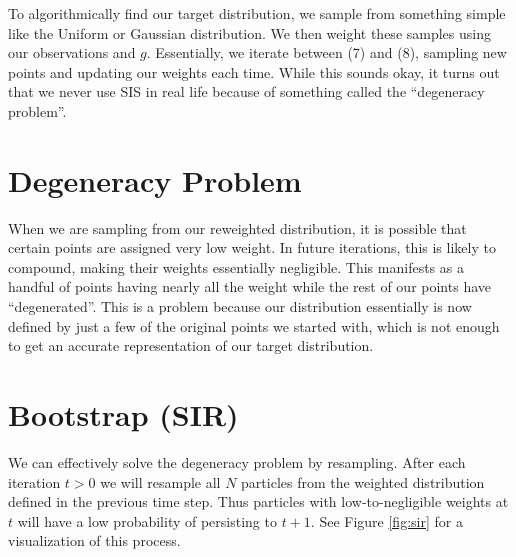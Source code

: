 \documentclass{article}
\begin{document}
To algorithmically find our target distribution, we sample from something simple like the Uniform or Gaussian distribution. We then weight these samples using our observations and $g$. Essentially, we iterate between (7) and (8), sampling new points and updating our weights each time. While this sounds okay, it turns out that we never use SIS in real life because of something called the ``degeneracy problem''.

\section{Degeneracy Problem}
When we are sampling from our reweighted distribution, it is possible that certain points are assigned very low weight. In future iterations, this is likely to compound, making their weights essentially negligible. This manifests as a handful of points having nearly all the weight while the rest of our points have ``degenerated''. This is a problem because our distribution essentially is now defined by just a few of the original points we started with, which is not enough to get an accurate representation of our target distribution.


\section{Bootstrap (SIR)}
We can effectively solve the degeneracy problem by resampling. After each iteration $t>0$ we will resample all $N$ particles from the weighted distribution defined in the previous time step. Thus particles with low-to-negligible weights at $t$ will have a low probability of persisting to $t+1$. See Figure \ref{fig:sir} for a visualization of this process.
\end{document}
